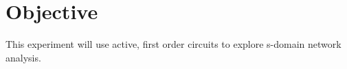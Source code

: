 \section{Objective}\label{sec:objective}
This experiment will use active, first order circuits to explore s-domain network analysis.
